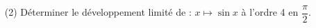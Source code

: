 
\begin{exercice}\label{exoautoanalyseCTU-43devoir}


\begin{enumerate}

\item[(2)] Déterminer le développement limité de : $x \mapsto \sin x$ à l'ordre 4 en $\dfrac{\pi}{2}$.

\end{enumerate}


\end{exercice}
